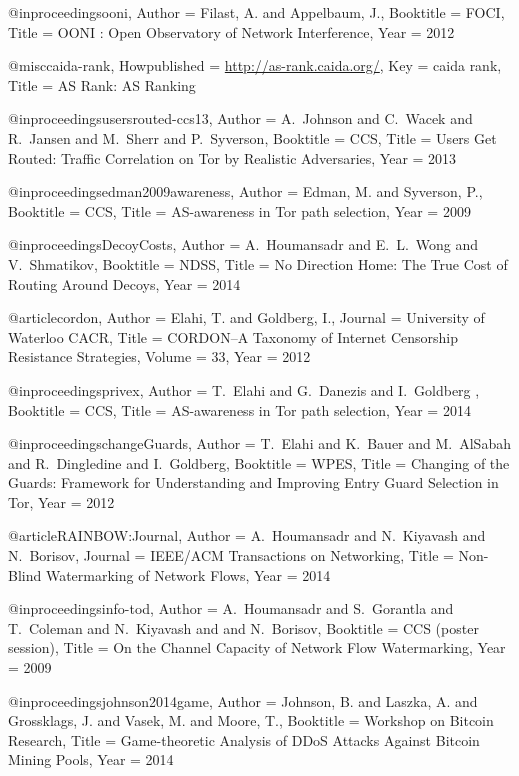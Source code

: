 {{{{{	@inproceedings{ooni,
	Author = {Filast, A. and Appelbaum, J.},
	Booktitle = {{FOCI}},
	Title = {{OONI : Open Observatory of Network Interference}},
	Year = {2012}}
	
	@misc{caida-rank,
	Howpublished = {\url{http://as-rank.caida.org/}},
	Key = {caida rank},
	Title = {{AS Rank: AS Ranking}}}
	
	@inproceedings{usersrouted-ccs13,
	Author = {A.~Johnson and C.~Wacek and R.~Jansen and M.~Sherr and P.~Syverson},
	Booktitle = {CCS},
	Title = {{Users Get Routed: Traffic Correlation on Tor by Realistic Adversaries}},
	Year = {2013}}
	
	@inproceedings{edman2009awareness,
	Author = {Edman, M. and Syverson, P.},
	Booktitle = {{CCS}},
	Title = {{AS-awareness in Tor path selection}},
	Year = {2009}}
	
	@inproceedings{DecoyCosts,
	Author = {A.~Houmansadr and E.~L.~Wong and V.~Shmatikov},
	Booktitle = {NDSS},
	Title = {{No Direction Home: The True Cost of Routing Around Decoys}},
	Year = {2014}}
	
	@article{cordon,
	Author = {Elahi, T. and Goldberg, I.},
	Journal = {University of Waterloo CACR},
	Title = {{CORDON--A Taxonomy of Internet Censorship Resistance Strategies}},
	Volume = {33},
	Year = {2012}}
	
	@inproceedings{privex,
	Author = {T.~Elahi and G.~Danezis and I.~Goldberg	},
	Booktitle = {{CCS}},
	Title = {{AS-awareness in Tor path selection}},
	Year = {2014}}
	
	@inproceedings{changeGuards,
	Author = {T.~Elahi and K.~Bauer and M.~AlSabah and R.~Dingledine and I.~Goldberg},
	Booktitle = {{WPES}},
	Title = {{ Changing of the Guards: Framework for Understanding and Improving Entry Guard Selection in Tor}},
	Year = {2012}}
	
	@article{RAINBOW:Journal,
	Author = {A.~Houmansadr and N.~Kiyavash and N.~Borisov},
	Journal = {IEEE/ACM Transactions on Networking},
	Title = {{Non-Blind Watermarking of Network Flows}},
	Year = 2014}
	
	@inproceedings{info-tod,
	Author = {A.~Houmansadr and S.~Gorantla and T.~Coleman and N.~Kiyavash and and N.~Borisov},
	Booktitle = {{CCS (poster session)}},
	Title = {{On the Channel Capacity of Network Flow Watermarking}},
	Year = {2009}}
	
	@inproceedings{johnson2014game,
	Author = {Johnson, B. and Laszka, A. and Grossklags, J. and Vasek, M. and Moore, T.},
	Booktitle = {Workshop on Bitcoin Research},
	Title = {{Game-theoretic Analysis of DDoS Attacks Against Bitcoin Mining Pools}},
	Year = {2014}}
	
}}}}}

